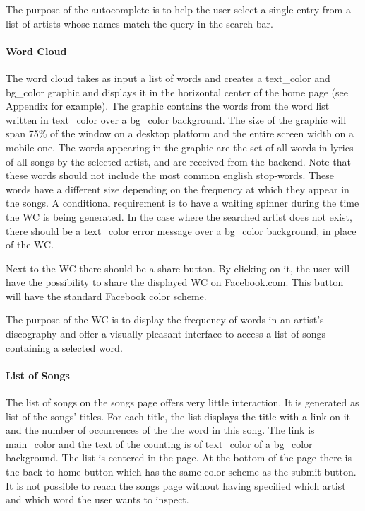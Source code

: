 \documentclass[]{article}
\begin{document}
The purpose of the autocomplete is to help the user select a single
entry from a list of artists whose names match the query in the search
bar.

\paragraph{Word Cloud}\label{word-cloud}

The word cloud takes as input a list of words and creates a text\_color
and bg\_color graphic and displays it in the horizontal center of the
home page (see Appendix for example). The graphic contains the words
from the word list written in text\_color over a bg\_color background.
The size of the graphic will span 75\% of the window on a desktop
platform and the entire screen width on a mobile one. The words
appearing in the graphic are the set of all words in lyrics of all songs
by the selected artist, and are received from the backend. Note that
these words should not include the most common english stop-words. These
words have a different size depending on the frequency at which they
appear in the songs. A conditional requirement is to have a waiting
spinner during the time the WC is being generated. In the case where the
searched artist does not exist, there should be a text\_color error
message over a bg\_color background, in place of the WC.

Next to the WC there should be a share button. By clicking on it, the
user will have the possibility to share the displayed WC on
Facebook.com. This button will have the standard Facebook color scheme.

The purpose of the WC is to display the frequency of words in an
artist's discography and offer a visually pleasant interface to access a
list of songs containing a selected word.

\paragraph{List of Songs}\label{list-of-songs}

The list of songs on the songs page offers very little interaction. It
is generated as list of the songs' titles. For each title, the list
displays the title with a link on it and the number of occurrences of
the the word in this song. The link is main\_color and the text of the
counting is of text\_color of a bg\_color background. The list is
centered in the page. At the bottom of the page there is the back to
home button which has the same color scheme as the submit button. It is
not possible to reach the songs page without having specified which
artist and which word the user wants to inspect.
\end{document}
